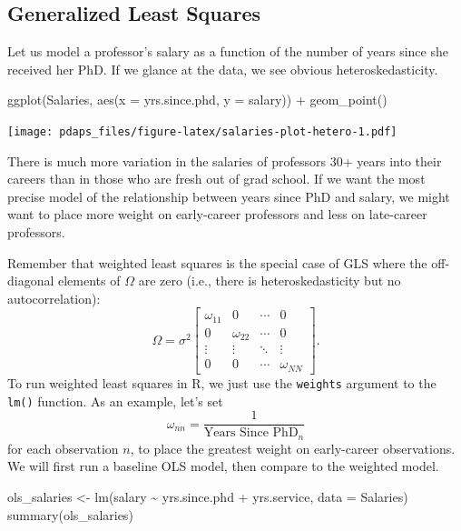 \documentclass[
  12pt,
  oneside,openany]{book}
\newenvironment{Shaded}{\begin{snugshade}}{\end{snugshade}}
\newcommand{\AttributeTok}[1]{\textcolor[rgb]{0.77,0.63,0.00}{#1}}
\newcommand{\FunctionTok}[1]{\textcolor[rgb]{0.00,0.00,0.00}{#1}}
\newcommand{\NormalTok}[1]{#1}
\newcommand{\OtherTok}[1]{\textcolor[rgb]{0.56,0.35,0.01}{#1}}
\newcommand{\SpecialCharTok}[1]{\textcolor[rgb]{0.00,0.00,0.00}{#1}}
\begin{document}
\hypertarget{generalized-least-squares-1}{%
\subsection{Generalized Least Squares}\label{generalized-least-squares-1}}

Let us model a professor's salary as a function of the number of years since she received her PhD. If we glance at the data, we see obvious heteroskedasticity.

\begin{Shaded}
\begin{Highlighting}[]
\FunctionTok{ggplot}\NormalTok{(Salaries, }\FunctionTok{aes}\NormalTok{(}\AttributeTok{x =}\NormalTok{ yrs.since.phd, }\AttributeTok{y =}\NormalTok{ salary)) }\SpecialCharTok{+}
    \FunctionTok{geom\_point}\NormalTok{()}
\end{Highlighting}
\end{Shaded}

\texttt{[image: pdaps\_files/figure-latex/salaries-plot-hetero-1.pdf]}

There is much more variation in the salaries of professors 30+ years into their careers than in those who are fresh out of grad school. If we want the most precise model of the relationship between years since PhD and salary, we might want to place more weight on early-career professors and less on late-career professors.

Remember that weighted least squares is the special case of GLS where the off-diagonal elements of \(\Omega\) are zero (i.e., there is heteroskedasticity but no autocorrelation):
\[
\Omega = \sigma^2 \begin{bmatrix}
  \omega_{11} & 0 & \cdots & 0 \\
  0 & \omega_{22} & \cdots & 0 \\
  \vdots & \vdots & \ddots & \vdots \\
  0 & 0 & \cdots & \omega_{NN}
\end{bmatrix}.
\]
To run weighted least squares in R, we just use the \texttt{weights} argument to the \texttt{lm()} function. As an example, let's set
\[
\omega_{nn} = \frac{1}{\text{Years Since PhD}_n}
\]
for each observation \(n\), to place the greatest weight on early-career observations. We will first run a baseline OLS model, then compare to the weighted model.

\begin{Shaded}
\begin{Highlighting}[]
\NormalTok{ols\_salaries }\OtherTok{\textless{}{-}} \FunctionTok{lm}\NormalTok{(salary }\SpecialCharTok{\textasciitilde{}}\NormalTok{ yrs.since.phd }\SpecialCharTok{+}\NormalTok{ yrs.service,}
                   \AttributeTok{data =}\NormalTok{ Salaries)}
\FunctionTok{summary}\NormalTok{(ols\_salaries)}
\end{Highlighting}
\end{Shaded}
\end{document}

